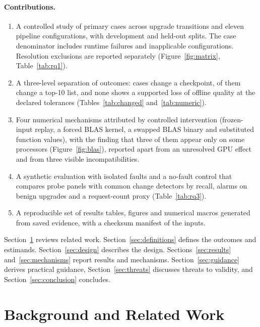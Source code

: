 \documentclass[11pt,a4paper]{article}
\begin{document}
\paragraph{Contributions.}
\begin{enumerate}
  \item A controlled study of \nCases{} primary cases across \nTransitions{}
    upgrade transitions and eleven pipeline configurations, with development
    and held-out splits. The case denominator includes runtime failures and
    inapplicable configurations. Resolution exclusions are reported separately
    (Figure~\ref{fig:matrix}, Table~\ref{tab:rq1}).
  \item A three-level separation of outcomes: \nChanged{} cases change a
    checkpoint, \nListChanged{} of them change a top-10 list, and none shows a
    supported loss of offline quality at the declared tolerances
    (Tables~\ref{tab:changed} and~\ref{tab:numeric}).
  \item Four numerical mechanisms attributed by controlled intervention
    (frozen-input replay, a forced BLAS kernel, a swapped BLAS binary and
    substituted function values), with the finding that three of them appear
    only on some processors (Figure~\ref{fig:blas}), reported apart from an
    unresolved GPU effect and from three visible incompatibilities.
  \item A synthetic evaluation with isolated faults and a no-fault control
    that compares probe panels with common change detectors by recall, alarms
    on benign upgrades and a request-count proxy (Table~\ref{tab:rq3}).
  \item A reproducible set of results tables, figures and numerical macros
    generated from saved evidence, with a checksum manifest of the inputs.
\end{enumerate}

Section~\ref{sec:related} reviews related work. Section~\ref{sec:definitions}
defines the outcomes and estimands. Section~\ref{sec:design} describes the
design. Sections~\ref{sec:results} and~\ref{sec:mechanisms} report results and
mechanisms. Section~\ref{sec:guidance} derives practical guidance,
Section~\ref{sec:threats} discusses threats to validity, and
Section~\ref{sec:conclusion} concludes.

\section{Background and Related Work}
\label{sec:related}
\end{document}
